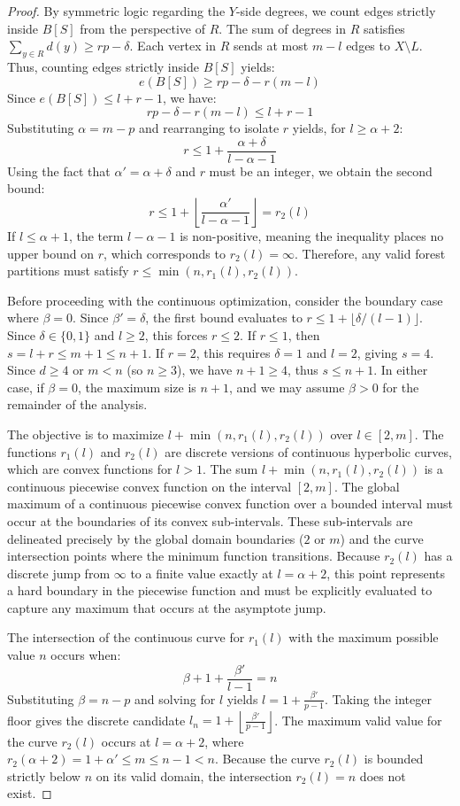 \documentclass[a4paper]{amsart}
\begin{document}
\begin{proof}
By symmetric logic regarding the $Y$-side degrees, we count edges strictly inside $B[S]$ from the perspective of $R$.
The sum of degrees in $R$ satisfies $\sum_{y \in R} d(y) \ge rp - \delta$.
Each vertex in $R$ sends at most $m-l$ edges to $X \setminus L$.
Thus, counting edges strictly inside $B[S]$ yields:
\[ e(B[S]) \ge rp - \delta - r(m-l) \]
Since $e(B[S]) \le l+r-1$, we have:
\[ rp - \delta - r(m-l) \le l+r-1 \]
Substituting $\alpha = m-p$ and rearranging to isolate $r$ yields, for $l \ge \alpha + 2$:
\[ r \le 1 + \frac{\alpha + \delta}{l - \alpha - 1} \]
Using the fact that $\alpha' = \alpha + \delta$ and $r$ must be an integer, we obtain the second bound:
\[ r \le 1 + \left\lfloor \frac{\alpha'}{l - \alpha - 1} \right\rfloor = r_2(l) \]
If $l \le \alpha + 1$, the term $l - \alpha - 1$ is non-positive, meaning the inequality places no upper bound on $r$, which corresponds to $r_2(l) = \infty$.
Therefore, any valid forest partitions must satisfy $r \le \min(n, r_1(l), r_2(l))$.

Before proceeding with the continuous optimization, consider the boundary case where $\beta = 0$. Since $\beta' = \delta$, the first bound evaluates to $r \le 1 + \lfloor \delta / (l-1) \rfloor$. Since $\delta \in \{0, 1\}$ and $l \ge 2$, this forces $r \le 2$. If $r \le 1$, then $s = l + r \le m + 1 \le n + 1$. If $r = 2$, this requires $\delta = 1$ and $l = 2$, giving $s = 4$. Since $d \ge 4$ or $m < n$ (so $n \ge 3$), we have $n+1 \ge 4$, thus $s \le n+1$. In either case, if $\beta = 0$, the maximum size is $n+1$, and we may assume $\beta > 0$ for the remainder of the analysis.

The objective is to maximize $l + \min(n, r_1(l), r_2(l))$ over $l \in [2, m]$.
The functions $r_1(l)$ and $r_2(l)$ are discrete versions of continuous hyperbolic curves, which are convex functions for $l > 1$. The sum $l + \min(n, r_1(l), r_2(l))$ is a continuous piecewise convex function on the interval $[2, m]$. The global maximum of a continuous piecewise convex function over a bounded interval must occur at the boundaries of its convex sub-intervals. These sub-intervals are delineated precisely by the global domain boundaries ($2$ or $m$) and the curve intersection points where the minimum function transitions. Because $r_2(l)$ has a discrete jump from $\infty$ to a finite value exactly at $l = \alpha + 2$, this point represents a hard boundary in the piecewise function and must be explicitly evaluated to capture any maximum that occurs at the asymptote jump.

The intersection of the continuous curve for $r_1(l)$ with the maximum possible value $n$ occurs when:
\[ \beta + 1 + \frac{\beta'}{l-1} = n \]
Substituting $\beta = n - p$ and solving for $l$ yields $l = 1 + \frac{\beta'}{p-1}$.
Taking the integer floor gives the discrete candidate $l_n = 1 + \left\lfloor \frac{\beta'}{p-1} \right\rfloor$.
The maximum valid value for the curve $r_2(l)$ occurs at $l = \alpha + 2$, where $r_2(\alpha+2) = 1 + \alpha' \le m \le n - 1 < n$. Because the curve $r_2(l)$ is bounded strictly below $n$ on its valid domain, the intersection $r_2(l) = n$ does not exist.


\end{proof}
\end{document}
